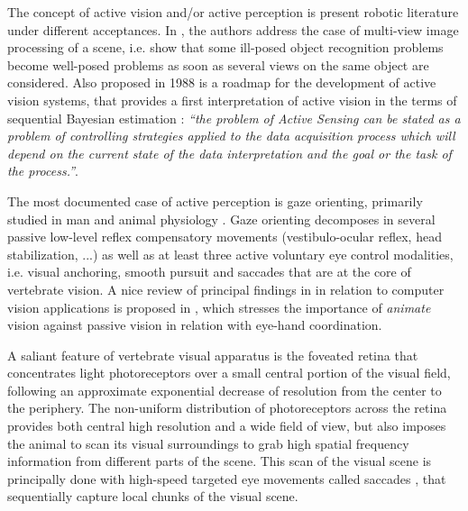 \documentclass[12pt,twoside,openright]{article}
\begin{document}
	
	The concept of active vision and/or active perception is present robotic literature under different acceptances. In \cite{aloimonos1988active}, the authors address the case of multi-view image processing of a scene, i.e. show that some ill-posed object recognition problems become well-posed problems as soon as several views on the  same object are considered. Also proposed in 1988 \cite{bajcsy1988active} is a roadmap for the development of active vision systems, that provides a first interpretation of active vision in the terms of sequential Bayesian estimation : \emph{{\color{blue} ``the problem  of Active Sensing can be stated as a problem of controlling strategies 
	applied to the data acquisition process which will depend on the current state 
	of the data interpretation and  the  goal  or the  task of  the  process.''}}.

	The most documented case of active perception is gaze orienting, primarily studied in man and animal physiology \cite{yarbus1967eye,robinson1968eye}. Gaze orienting decomposes in several passive low-level reflex compensatory movements (vestibulo-ocular reflex, head stabilization, ...) as well as at least three active voluntary eye control modalities, i.e. visual anchoring, smooth pursuit and saccades that are at the core of vertebrate vision.  A nice review of principal findings in in relation to computer vision applications is proposed in \cite{ballard1991animate},  which stresses the importance of \emph{animate} vision against passive vision in relation with eye-hand coordination.
	
	A saliant feature of vertebrate visual apparatus is the foveated retina that concentrates light photoreceptors over a small central portion of the visual field, following an approximate exponential decrease of resolution from the center to the periphery. The non-uniform distribution of photoreceptors across the retina provides both central high resolution and a wide field of view, but also imposes the animal to scan its visual surroundings to grab high spatial frequency information from different parts of the scene. This scan of the visual scene is principally done with high-speed targeted eye movements called saccades \cite{yarbus1967eye}, that sequentially capture local chunks of the visual scene. 
	
\end{document}
